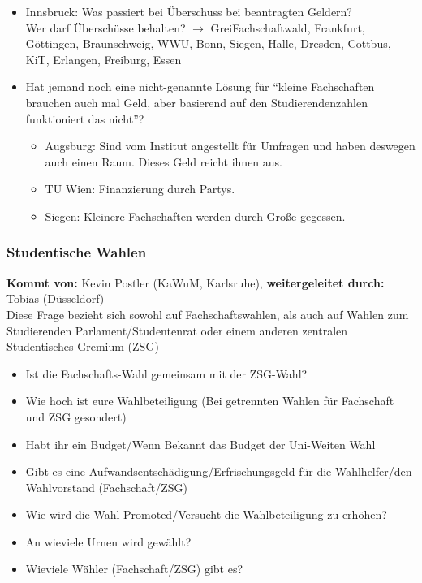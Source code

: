 \begin{itemize}
          \item Innsbruck: Was passiert bei Überschuss bei beantragten Geldern? \\
            Wer darf Überschüsse behalten? $\rightarrow$ GreiFachschaftwald, Frankfurt, Göttingen, Braunschweig, WWU, Bonn, Siegen, Halle, Dresden, Cottbus, KiT, Erlangen, Freiburg, Essen
          \item Hat jemand noch eine nicht-genannte Lösung für “kleine Fachschaften brauchen auch mal Geld, aber basierend auf den Studierendenzahlen funktioniert das nicht”?
            \begin{itemize}
              \item Augsburg: Sind vom Institut angestellt für Umfragen und haben deswegen auch einen Raum. Dieses Geld reicht ihnen aus.
              \item TU Wien: Finanzierung durch Partys.
              \item Siegen: Kleinere Fachschaften werden durch Große gegessen.
            \end{itemize}
        \end{itemize}

    \subsubsection*{Studentische Wahlen}
      \textbf{Kommt von:} Kevin Postler (KaWuM, Karlsruhe), \textbf{weitergeleitet durch:} Tobias (Düsseldorf) \\

        Diese Frage bezieht sich sowohl auf Fachschaftswahlen, als auch auf Wahlen zum Studierenden Parlament/Studentenrat oder einem anderen zentralen Studentisches Gremium (ZSG)

        \begin{itemize}
          \item Ist die Fachschafts-Wahl gemeinsam mit der ZSG-Wahl?
          \item Wie hoch ist eure Wahlbeteiligung (Bei getrennten Wahlen für Fachschaft und ZSG gesondert)
          \item Habt ihr ein Budget/Wenn Bekannt das Budget der Uni-Weiten Wahl
          \item Gibt es eine Aufwandsentschädigung/Erfrischungsgeld für die Wahlhelfer/den Wahlvorstand (Fachschaft/ZSG)
          \item Wie wird die Wahl Promoted/Versucht die Wahlbeteiligung zu erhöhen?
          \item An wieviele Urnen wird gewählt?
          \item Wieviele Wähler (Fachschaft/ZSG) gibt es?
        \end{itemize}

